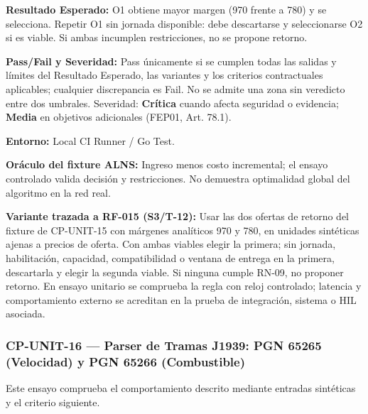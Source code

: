 \par\noindent\textbf{Resultado Esperado:} O1 obtiene mayor margen (970 frente a 780) y se selecciona. Repetir O1 sin jornada disponible: debe descartarse y seleccionarse O2 si es viable. Si ambas incumplen restricciones, no se propone retorno.\par
\par\noindent\textbf{Pass/Fail y Severidad:} Pass únicamente si se cumplen todas las salidas y límites del Resultado Esperado, las variantes y los criterios contractuales aplicables; cualquier discrepancia es Fail. No se admite una zona sin veredicto entre dos umbrales. Severidad: \textbf{Crítica} cuando afecta seguridad o evidencia; \textbf{Media} en objetivos adicionales (FEP01, Art. 78.1).\par
\par\noindent\textbf{Entorno:} Local CI Runner / Go Test.\par






\par\noindent\textbf{Oráculo del fixture ALNS:} Ingreso menos costo incremental; el ensayo controlado valida decisión y restricciones. No demuestra optimalidad global del algoritmo en la red real.\par\par


\par\noindent\textbf{Variante trazada a RF-015 (S3/T-12):} Usar las dos ofertas de retorno del fixture de CP-UNIT-15 con márgenes analíticos 970 y 780, en unidades sintéticas ajenas a precios de oferta. Con ambas viables elegir la primera; sin jornada, habilitación, capacidad, compatibilidad o ventana de entrega en la primera, descartarla y elegir la segunda viable. Si ninguna cumple RN-09, no proponer retorno. En ensayo unitario se comprueba la regla con reloj controlado; latencia y comportamiento externo se acreditan en la prueba de integración, sistema o HIL asociada.\par
\subsubsection*{CP-UNIT-16 — Parser de Tramas J1939: PGN 65265 (Velocidad) y PGN 65266 (Combustible)}\label{sec:9-cp-unit-16}

Este ensayo comprueba el comportamiento descrito mediante entradas sintéticas y el criterio siguiente.

